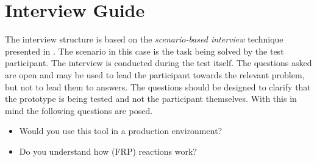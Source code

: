 \chapter{Interview Guide}
The interview structure is based on the \textit{scenario-based interview} technique presented in \cite{blackwell2004champagne}. The scenario in this case is the task being solved by the test participant. The interview is conducted during the test itself. The questions asked are open and may be used to lead the participant towards the relevant problem, but not to lead them to answers. The questions should be designed to clarify that the prototype is being tested and not the participant themselves. With this in mind the following questions are posed.

\begin{itemize}
  \item Would you use this tool in a production environment?
  \item Do you understand how (FRP) reactions work?
\end{itemize}
